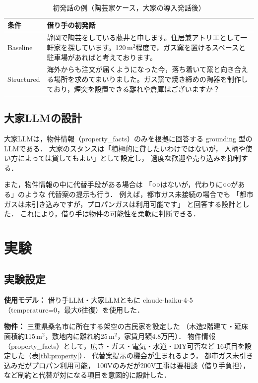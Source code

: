 \documentclass{FITpaper}
\begin{document}
\begin{table}[htbp]
  \centering
  \caption{初発話の例（陶芸家ケース，大家の導入発話後）}
  \label{tbl:dialogue_ex}
  \begin{tabular}{l|p{5.2cm}}
    条件 & 借り手の初発話 \\
    \hline
    Baseline & 静岡で陶芸をしている藤井と申します。住居兼アトリエとして一軒家を探しています。120\,m$^2$程度で，ガス窯を置けるスペースと駐車場があればと考えております。 \\
    \hline
    Structured & 海外からも注文が届くようになった今，落ち着いて窯と向き合える場所を求めてまいりました。ガス窯で焼き締めの陶器を制作しており，煙突を設置できる離れや倉庫はございますか？\\
  \end{tabular}
\end{table}

\subsection{大家LLMの設計}

大家LLMは，物件情報（property\_facts）のみを根拠に回答する
grounding 型のLLMである．
大家のスタンスは「積極的に貸したいわけではないが，
人柄や使い方によっては貸してもよい」として設定し，
過度な歓迎や売り込みを抑制する．

また，物件情報の中に代替手段がある場合は
「○○はないが，代わりに○○がある」のような
代替案の提示も行う．
例えば，都市ガス未接続の場合でも
「都市ガスは未引き込みですが，プロパンガスは利用可能です」
と回答する設計とした．
これにより，借り手は物件の可能性を柔軟に判断できる．

\section{実験}

\subsection{実験設定}

\textbf{使用モデル：}
借り手LLM・大家LLMともに claude-haiku-4-5
（temperature=0，最大6往復）を使用した．

\textbf{物件：}
三重県桑名市に所在する架空の古民家を設定した
（木造2階建て・延床面積約115\,m$^2$，敷地内に離れ約25\,m$^2$，家賃月額4.8万円）．
物件情報（property\_facts）として，広さ・ガス・電気・水道・DIY可否など
16項目を設定した（表\ref{tbl:property}）．
代替案提示の機会が生まれるよう，
都市ガス未引き込みだがプロパン利用可能，
100Vのみだが200V工事は要相談（借り手負担），
など制約と代替が対になる項目を意図的に設計した．
\end{document}
